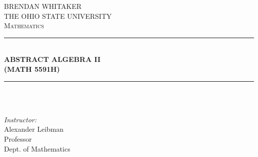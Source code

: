 \documentclass[9pt,reqno,twoside]{amsbook}
\theoremstyle{plain}
\numberwithin{section}{chapter}
\numberwithin{equation}{chapter}
\theoremstyle{definition}
\theoremstyle{remark}
\theoremstyle{plain}
\begin{document}
\begin{titlepage}

\newcommand{\HRule}{\rule{\linewidth}{0.5mm}} %

\center %
 

\textsc{\LARGE BRENDAN WHITAKER }\\[0.3cm] %
\textsc{\LARGE THE OHIO STATE UNIVERSITY  }\\[0.3cm]
\textsc{\Large Mathematics}\\[0.5cm] %


\HRule \\[0.4cm]
{ \Huge \bfseries ABSTRACT ALGEBRA II\\
\vspace{1mm}  (MATH 5591H)}\\[0.03cm] %
\HRule \\[1.5cm]

 

~
\begin{minipage}{0.4\textwidth}
\begin{center} \large
\emph{Instructor:} \\
Alexander Leibman\\Professor\\Dept. of Mathematics %
\end{center}
\end{minipage}\\[1cm]


\end{titlepage}
\end{document}
